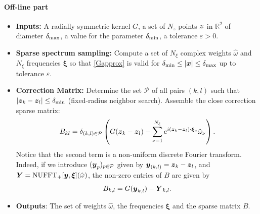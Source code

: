\documentclass[smallextended]{svjour3}
\begin{document}
\paragraph{Off-line part}
\begin{itemize}
	\item[]\textbf{Inputs:} A radially symmetric kernel $G$, a set of $N_z$ points $\boldsymbol{z}$ in $\mathbb{R}^2$ of diameter $\delta_{\max}$, a value for the parameter $\delta_{\min}$, a tolerance $\varepsilon > 0$.
	\item[]\textbf{Sparse spectrum sampling:} Compute a set of $N_\xi$ complex weights $\hat{\omega}$ and $N_\xi$ frequencies $\boldsymbol{\xi}$ so that \eqref{Gapprox} is valid for $\delta_{\min} \leq |\boldsymbol{x}| \leq \delta_{\max}$ up to tolerance $\varepsilon$. 
	\item[]\textbf{Correction Matrix:} Determine the set $\mathcal{P}$ of all pairs $(k,l)$ such that $\left\lvert \boldsymbol{z}_k - \boldsymbol{z}_l \right\rvert \leq \delta_{\min}$ (fixed-radius neighbor search). Assemble the close correction sparse matrix:
	      \begin{equation}
	      	\label{defB}
	      	B_{kl} = \delta_{(k,l) \in \mathcal{P}} \left( G({\boldsymbol{z}_k - \boldsymbol{z}_l}) - \sum_{\nu = 1}^{N_{\xi}}e^{i (\boldsymbol{z}_k - \boldsymbol{z}_l)\cdot \boldsymbol{\xi}_\nu} \hat{\omega}_\nu\right).
	      \end{equation}
	      Notice that the second term is a non-uniform discrete Fourier transform. Indeed, if we introduce $(\boldsymbol{y}_p)_{p \in \mathcal{P}}$ given by 
	      $\boldsymbol{y}_{(k,l)} = \boldsymbol{z}_k - \boldsymbol{z}_l$, and $\boldsymbol{Y} = \textup{NUFFT}_+[\boldsymbol{y},\boldsymbol{\xi}](\hat{\omega})$, the non-zero entries of $B$ are given by
	      \[ B_{k,l} = G(\boldsymbol{y}_{k,l}) - \boldsymbol{Y}_{k,l}.\]
	\item[] \textbf{Outputs}: The set of weights $\hat{\omega}$, the frequencies $\boldsymbol{\xi}$ and the sparse matrix $B$. 
\end{itemize}
\end{document}
